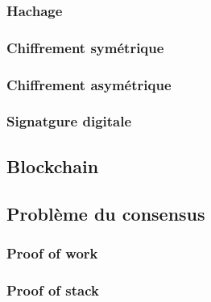 \subsubsection{Hachage}
\subsubsection{Chiffrement symétrique}
\subsubsection{Chiffrement asymétrique}
\subsubsection{Signatgure digitale}

\subsection{Blockchain}

\subsection{Problème du consensus}
\subsubsection{Proof of work}
\subsubsection{Proof of stack}

